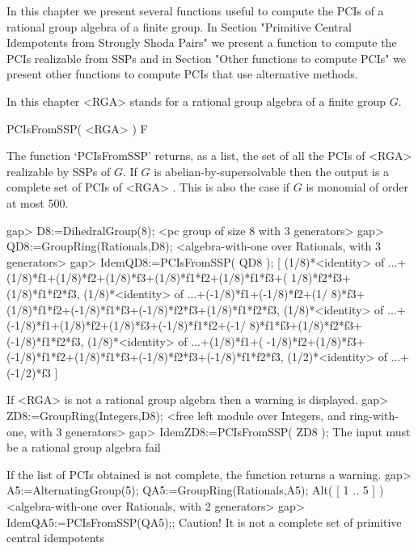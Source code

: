 
In this chapter we present several functions useful to compute the PCIs of a rational group 
algebra of a finite group. In Section "Primitive Central Idempotents from Strongly Shoda 
Pairs" we present a function to compute the PCIs realizable from SSPs and in Section "Other 
functions to compute PCIs" we present other functions to compute PCIs that use alternative 
methods. 

In this chapter <RGA> stands for a rational group algebra of a finite group $G$. 

 

\>PCIsFromSSP( <RGA>  ) F

The function `PCIsFromSSP' returns, as a list, the set of all the PCIs of 
<RGA> realizable by SSPs of $G$. If $G$ is abelian-by-supersolvable then 
the output is a complete set of PCIs of <RGA> \cite{ORS}. 
This is also the case if $G$ is monomial of order at most 500. 

\beginexample
    gap> D8:=DihedralGroup(8);
    <pc group of size 8 with 3 generators>
    gap> QD8:=GroupRing(Rationals,D8);
    <algebra-with-one over Rationals, with 3 generators>
    gap> IdemQD8:=PCIsFromSSP( QD8 );
    [ (1/8)*<identity> of ...+(1/8)*f1+(1/8)*f2+(1/8)*f3+(1/8)*f1*f2+(1/8)*f1*f3+(
        1/8)*f2*f3+(1/8)*f1*f2*f3, (1/8)*<identity> of ...+(-1/8)*f1+(-1/8)*f2+(1/
        8)*f3+(1/8)*f1*f2+(-1/8)*f1*f3+(-1/8)*f2*f3+(1/8)*f1*f2*f3,
      (1/8)*<identity> of ...+(-1/8)*f1+(1/8)*f2+(1/8)*f3+(-1/8)*f1*f2+(-1/
        8)*f1*f3+(1/8)*f2*f3+(-1/8)*f1*f2*f3, (1/8)*<identity> of ...+(1/8)*f1+(
        -1/8)*f2+(1/8)*f3+(-1/8)*f1*f2+(1/8)*f1*f3+(-1/8)*f2*f3+(-1/8)*f1*f2*f3,
      (1/2)*<identity> of ...+(-1/2)*f3 ]
\endexample

If <RGA> is not a rational group algebra then a warning is displayed.
\beginexample
    gap> ZD8:=GroupRing(Integers,D8);
    <free left module over Integers, and ring-with-one, with 3 generators>
    gap> IdemZD8:=PCIsFromSSP( ZD8 );
    The input must be a rational group algebra
    fail
\endexample
    

If the list of PCIs obtained is not complete, the function returns a warning.
\beginexample
    gap> A5:=AlternatingGroup(5); QA5:=GroupRing(Rationals,A5);
    Alt( [ 1 .. 5 ] )
    <algebra-with-one over Rationals, with 2 generators>
    gap> IdemQA5:=PCIsFromSSP(QA5);;
    Caution! It is not a complete set of primitive central idempotents
\endexample


